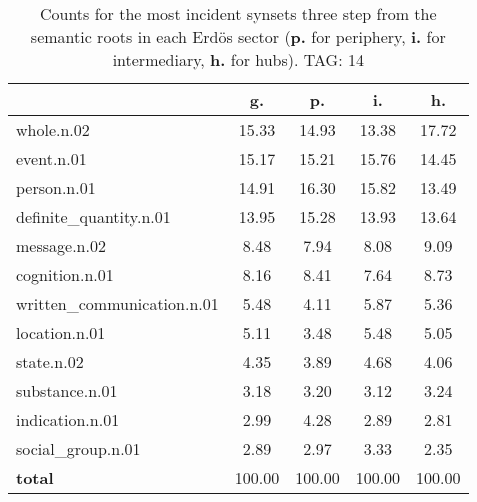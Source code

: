 \begin{table}[h!]
\begin{center}
\begin{tabular}{| l | c | c | c | c |}\hline
 & g. & p. & i. & h. \\\hline
whole.n.02 & 15.33  & 14.93  & 13.38  & 17.72 \\\hline
event.n.01 & 15.17  & 15.21  & 15.76  & 14.45 \\\hline
person.n.01 & 14.91  & 16.30  & 15.82  & 13.49 \\\hline
definite\_quantity.n.01 & 13.95  & 15.28  & 13.93  & 13.64 \\\hline
message.n.02 & 8.48  & 7.94  & 8.08  & 9.09 \\\hline
cognition.n.01 & 8.16  & 8.41  & 7.64  & 8.73 \\\hline
written\_communication.n.01 & 5.48  & 4.11  & 5.87  & 5.36 \\\hline
location.n.01 & 5.11  & 3.48  & 5.48  & 5.05 \\\hline
state.n.02 & 4.35  & 3.89  & 4.68  & 4.06 \\\hline
substance.n.01 & 3.18  & 3.20  & 3.12  & 3.24 \\\hline
indication.n.01 & 2.99  & 4.28  & 2.89  & 2.81 \\\hline
social\_group.n.01 & 2.89  & 2.97  & 3.33  & 2.35 \\\hline
{{\bf total}} & 100.00  & 100.00  & 100.00  & 100.00 \\\hline
\end{tabular}
\caption{Counts for the most incident synsets three step from the semantic roots in each Erd\"os sector ({\bf p.} for periphery, {\bf i.} for intermediary, {\bf h.} for hubs). TAG: 14}
\end{center}
\end{table}